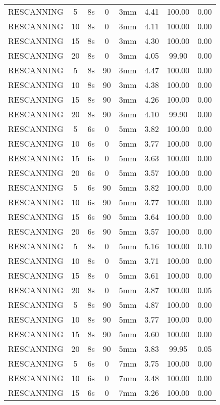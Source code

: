 \begin{table}[H]
\begin{tabular}{|c|c||c|c|c||c|c|c|}
RESCANNING & 5 & 8s & 0 & 3mm & 4.41 & 100.00 & 0.00 \\
RESCANNING & 10 & 8s & 0 & 3mm & 4.11 & 100.00 & 0.00 \\
RESCANNING & 15 & 8s & 0 & 3mm & 4.30 & 100.00 & 0.00 \\
RESCANNING & 20 & 8s & 0 & 3mm & 4.05 & 99.90 & 0.00 \\
RESCANNING & 5 & 8s & 90 & 3mm & 4.47 & 100.00 & 0.00 \\
RESCANNING & 10 & 8s & 90 & 3mm & 4.38 & 100.00 & 0.00 \\
RESCANNING & 15 & 8s & 90 & 3mm & 4.26 & 100.00 & 0.00 \\
RESCANNING & 20 & 8s & 90 & 3mm & 4.10 & 99.90 & 0.00 \\
RESCANNING & 5 & 6s & 0 & 5mm & 3.82 & 100.00 & 0.00 \\
RESCANNING & 10 & 6s & 0 & 5mm & 3.77 & 100.00 & 0.00 \\
RESCANNING & 15 & 6s & 0 & 5mm & 3.63 & 100.00 & 0.00 \\
RESCANNING & 20 & 6s & 0 & 5mm & 3.57 & 100.00 & 0.00 \\
RESCANNING & 5 & 6s & 90 & 5mm & 3.82 & 100.00 & 0.00 \\
RESCANNING & 10 & 6s & 90 & 5mm & 3.77 & 100.00 & 0.00 \\
RESCANNING & 15 & 6s & 90 & 5mm & 3.64 & 100.00 & 0.00 \\
RESCANNING & 20 & 6s & 90 & 5mm & 3.57 & 100.00 & 0.00 \\
RESCANNING & 5 & 8s & 0 & 5mm & 5.16 & 100.00 & 0.10 \\
RESCANNING & 10 & 8s & 0 & 5mm & 3.71 & 100.00 & 0.00 \\
RESCANNING & 15 & 8s & 0 & 5mm & 3.61 & 100.00 & 0.00 \\
RESCANNING & 20 & 8s & 0 & 5mm & 3.87 & 100.00 & 0.05 \\
RESCANNING & 5 & 8s & 90 & 5mm & 4.87 & 100.00 & 0.00 \\
RESCANNING & 10 & 8s & 90 & 5mm & 3.77 & 100.00 & 0.00 \\
RESCANNING & 15 & 8s & 90 & 5mm & 3.60 & 100.00 & 0.00 \\
RESCANNING & 20 & 8s & 90 & 5mm & 3.83 & 99.95 & 0.05 \\
RESCANNING & 5 & 6s & 0 & 7mm & 3.75 & 100.00 & 0.00 \\
RESCANNING & 10 & 6s & 0 & 7mm & 3.48 & 100.00 & 0.00 \\
RESCANNING & 15 & 6s & 0 & 7mm & 3.26 & 100.00 & 0.00 \\

\end{tabular}
\end{table}
